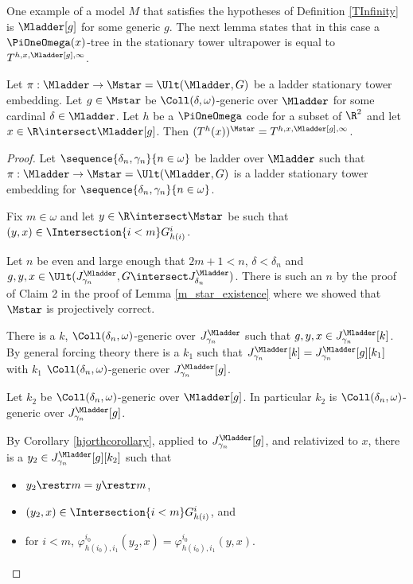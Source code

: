 \documentclass[oneside,12pt]{amsart}
\begin{document}
One example of a model $M$ that satisfies the hypotheses of Definition \ref{TInfinity} is
$\Mladder[g]$ for some generic $g$. The next lemma states that in this case
a $\PiOneOmega(x)$-tree in the stationary tower ultrapower is equal to
$T^{h,x,\Mladder[g],\infty}$.

\begin{lemma}
\label{TStarIsTInfinity}
Let $\pi:\Mladder\to\Mstar=\Ult(\Mladder,G)$ be a ladder stationary tower embedding.
Let $g\in\Mstar$ be $\Coll(\delta,\omega)$-generic over $\Mladder$ for some cardinal $\delta\in\Mladder$.
Let $h$ be a $\PiOneOmega$ code for a subset
of $\R^2$ and let $x\in\R\intersect \Mladder[g]$.
Then $(T^h(x))^{\Mstar} = T^{h,x,\Mladder[g],\infty}$.
\end{lemma}
\begin{proof}
Let $\sequence{\delta_n,\gamma_n}{n\in\omega}$ be  ladder over $\Mladder$ such that
$\pi:\Mladder\to\Mstar=\Ult(\Mladder,G)$ is a ladder stationary tower embedding for $\sequence{\delta_n,\gamma_n}{n\in\omega}$.

Fix $m\in\omega$ and let  $y\in\R\intersect\Mstar$ be such that
$(y,x)\in \Intersection{i<m} G^i_{h(i)}$.

Let $n$ be even and large enough that $2m+1 < n$, $\delta < \delta_n$ and $g,y,x\in \Ult(J^{\Mladder}_{\gamma_n},G\intersect J^{\Mladder}_{\delta_n})$.
There is such an $n$ by the proof of Claim 2 in the proof of Lemma \ref{m_star_existence} where we showed that $\Mstar$ is projectively correct.

There is a $k$, $\Coll(\delta_n,\omega)$-generic over $J^{\Mladder}_{\gamma_n}$ such that $g,y,x\in J^{\Mladder}_{\gamma_n}[k]$.
By general forcing theory there is a $k_1$ such that $J^{\Mladder}_{\gamma_n}[k]=J^{\Mladder}_{\gamma_n}[g][k_1]$ with $k_1$
$\Coll(\delta_n,\omega)$-generic over $J^{\Mladder}_{\gamma_n}[g]$.

Let $k_2$ be
$\Coll(\delta_n,\omega)$-generic over $\Mladder[g]$. In particular $k_2$ is
$\Coll(\delta_n,\omega)$-generic over $J^{\Mladder}_{\gamma_n}[g]$.

By Corollary \ref{hjorthcorollary}, applied to $J^{\Mladder}_{\gamma_n}[g]$, and relativized to $x$,
there is a $y_2\in J^{\Mladder}_{\gamma_n}[g][k_2]$ such that
\begin{itemize}
\item $y_2 \restr m = y \restr m$,
\item $(y_2,x)\in \Intersection{i<m} G^i_{h(i)}$, and
\item for $i<m$, $\varphi^{i_0}_{h(i_0),i_1}(y_2,x) = \varphi^{i_0}_{h(i_0),i_1}(y,x)$.
\end{itemize}


\end{proof}
\end{document}
